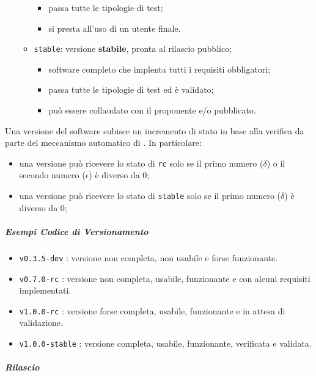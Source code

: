 \begin{itemize}
\begin{itemize}
\begin{itemize}
					\item passa tutte le tipologie di test;
					\item si presta all'uso di un utente finale.
				\end{itemize}
				\item \verb!stable!: versione \textbf{stabile}, pronta al rilascio pubblico;
				\begin{itemize}
					\item software completo che implenta tutti i requisiti obbligatori;
					\item passa tutte le tipologie di test ed è validato;
					\item può essere collaudato con il proponente e/o pubblicato.
				\end{itemize}
			\end{itemize}
		\end{itemize}

		Una versione del software subisce un incremento di stato in base alla verifica da parte del meccanismo automatico di . In particolare:
		\begin{itemize}
			\item una versione può ricevere lo stato di \verb!rc! solo se il primo numero (\(\delta\)) o il secondo numero (\(\epsilon\)) è diverso da 0;
			\item una versione può ricevere lo stato di \verb!stable! solo se il primo numero (\(\delta\)) è diverso da 0;
		\end{itemize}
		
		\subparagraph{Esempi Codice di Versionamento} 
		
		\begin{itemize}
			\item \verb!v0.3.5-dev! : versione non completa, non usabile e forse funzionante.
			\item \verb!v0.7.0-rc! : versione non completa, usabile, funzionante e con alcuni requisiti implementati. 
			\item \verb!v1.0.0-rc! : versione forse completa, usabile, funzionante e in attesa di validazione.
			\item \verb!v1.0.0-stable! : versione completa, usabile, funzionante, verificata e validata.
		\end{itemize}

		\subparagraph{Rilascio}

